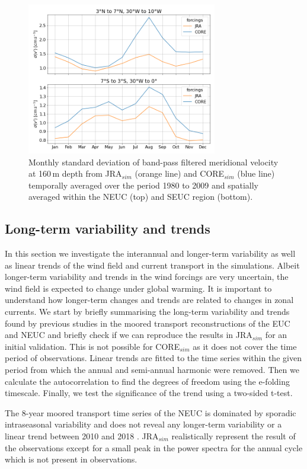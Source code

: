 \documentclass[os, manuscript]{copernicus}
\begin{document}
	\begin{figure}[t]
		\includegraphics[width=8.3cm]{../../figures/paper/f07_INALT20_JRA_CORE_TIW_NEUC_SEUC_clim_1980_2009.png}
		\caption{Monthly standard deviation of band-pass filtered meridional velocity at 160$\,$m depth from JRA$_{sim}$ (orange line) and CORE$_{sim}$ (blue line) temporally averaged over the period 1980 to 2009 and spatially averaged within the NEUC (top) and SEUC region (bottom).}
		\label{fig_TIW_clim}
	\end{figure}   
	
	\subsection{Long-term variability and trends}
	In this section we investigate the interannual and longer-term variability as well as linear trends of the wind field and current transport in the simulations. Albeit longer-term variability and trends in the wind forcings are very uncertain, the wind field is expected to change under global warming. It is important to understand how longer-term changes and trends are related to changes in zonal currents. We start by briefly summarising the long-term variability and trends found by previous studies in the moored transport reconstructions of the EUC \citep{Brandt2021a} and NEUC \citep{Burmeister2020} and briefly check if we can reproduce the results in JRA$_{sim}$ for an initial validation. This is not possible for CORE$_{sim}$ as it does not cover the time period of observations. Linear trends are fitted to the time series within the given period from which the annual and semi-annual harmonic were removed. Then we calculate the autocorrelation to find the degrees of freedom using the e-folding timescale. Finally, we test the significance of the trend using a two-sided t-test.
	
	The 8-year moored transport time series of the NEUC is dominated by sporadic intraseasonal variability and does not reveal any longer-term variability or a linear trend between 2010 and 2018 \cite[Fig. \ref{fig_EUC_NEUC_ts}c,d;][]{Burmeister2020}. JRA$_{sim}$ realistically represent the result of the observations except for a small peak in the power spectra for the annual cycle which is not present in observations.
	
\end{document}

